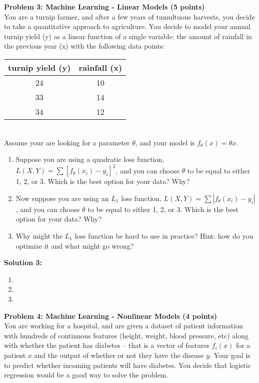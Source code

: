 \documentclass[]{article}
\begin{document}
\clearpage
\textbf{Problem 3: Machine Learning - Linear Models (5 points)}\\
You are a turnip farmer, and after a few years of tumultuous harvests, you decide to take a quantitative approach to agriculture. You decide to model your annual turnip yield (y) as a linear function of a single variable: the amount of rainfall in the previous year (x) with the following data points:
\begin{table}[ht]
    \center
    \begin{tabular}{|c|c|}
    \hline
    turnip yield (y) & rainfall (x) \\
    \hline
    24 & 10 \\
    \hline
    33 & 14 \\
    \hline
    34 & 12 \\
    \hline
    \end{tabular}
\end{table} \\
Assume your are looking for a parameter $\theta$, and your model is $f_{\theta}(x) = \theta x$.
\begin{enumerate}[label=(\alph*)]
    \item Suppose you are using a quadratic loss function, $L(X, Y) = \sum \left[f_{\theta}(x_i) - y_i\right]^2$, and you can choose $\theta$ to be equal to either 1, 2, or 3. Which is the best option for your data? Why?
    \item Now suppose you are using an $L_1$ loss function, $L(X, Y) = \sum \left|f_{\theta}(x_i) - y_i\right|$, and you can choose $\theta$ to be equal to either 1, 2, or 3. Which is the best option for your data? Why?
    \item Why might the $L_1$ loss function be hard to use in practice? Hint: how do you optimize it and what might go wrong?
\end{enumerate}

\textbf{Solution 3:}
\begin{enumerate}[label=(\alph*)]
    \item %
    \item %
    \item %
\end{enumerate}

\clearpage
\textbf{Problem 4: Machine Learning - Nonlinear Models (4 points)}\\
You are working for a hospital, and are given a dataset of patient information with hundreds of continuous features (height, weight, blood pressure, etc) along with whether the patient has diabetes -- that is a vector of features $f_i(x)$ for a patient $x$ and the output of whether or not they have the disease $y$. Your goal is to predict whether incoming patients will have diabetes. You decide that logistic regression would be a good way to solve the problem.
\end{document}
